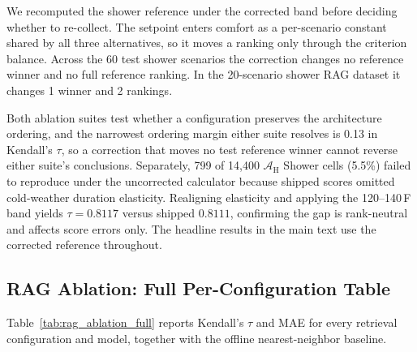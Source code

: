 \documentclass[11pt]{article}
\begin{document}
We recomputed the shower reference under the corrected band before deciding whether to re-collect. The setpoint enters comfort as a per-scenario constant shared by all three alternatives, so it moves a ranking only through the criterion balance. Across the 60 test shower scenarios the correction changes no reference winner and no full reference ranking. In the 20-scenario shower RAG dataset it changes 1 winner and 2 rankings. 

Both ablation suites test whether a configuration preserves the architecture ordering, and the narrowest ordering margin either suite resolves is 0.13 in Kendall's $\tau$, so a correction that moves no test reference winner cannot reverse either suite's conclusions. Separately, 799 of 14,400 $\mathcal{A}_{\text{H}}$ Shower cells (5.5\%) failed to reproduce under the uncorrected calculator because shipped scores omitted cold-weather duration elasticity. Realigning elasticity and applying the 120--140\,\textdegree{}F band yields $\tau = 0.8117$ versus shipped $0.8111$, confirming the gap is rank-neutral and affects score errors only. The headline results in the main text use the corrected reference throughout.

\subsection{RAG Ablation: Full Per-Configuration Table}
\label{app:rag_ablation_full}

Table~\ref{tab:rag_ablation_full} reports Kendall's $\tau$ and MAE for every retrieval configuration and model, together with the offline nearest-neighbor baseline.
\end{document}
